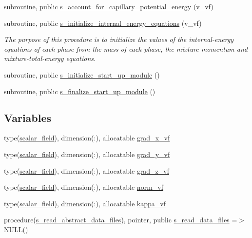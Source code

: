 \begin{DoxyCompactItemize}
subroutine, public \hyperlink{namespacem__start__up_a7e47c12de90e408e70de7da3f2d24e28}{s\+\_\+account\+\_\+for\+\_\+capillary\+\_\+potential\+\_\+energy} (v\+\_\+vf)
\item 
subroutine, public \hyperlink{namespacem__start__up_a38182f7fcc92c1c687840339a20e85cd}{s\+\_\+initialize\+\_\+internal\+\_\+energy\+\_\+equations} (v\+\_\+vf)
\begin{DoxyCompactList}\small\item\em The purpose of this procedure is to initialize the values of the internal-\/energy equations of each phase from the mass of each phase, the mixture momentum and mixture-\/total-\/energy equations. \end{DoxyCompactList}\item 
subroutine, public \hyperlink{namespacem__start__up_a37202711d89d04cd18f08170ba608aa1}{s\+\_\+initialize\+\_\+start\+\_\+up\+\_\+module} ()
\item 
subroutine, public \hyperlink{namespacem__start__up_a65fd279db64882a3732a0549ec74e335}{s\+\_\+finalize\+\_\+start\+\_\+up\+\_\+module} ()
\end{DoxyCompactItemize}
\subsection*{Variables}
\begin{DoxyCompactItemize}
\item 
type(\hyperlink{structm__derived__types_1_1scalar__field}{scalar\+\_\+field}), dimension(\+:), allocatable \hyperlink{namespacem__start__up_acd3b736578c59b1bd9dfc4b81f4a7279}{grad\+\_\+x\+\_\+vf}
\item 
type(\hyperlink{structm__derived__types_1_1scalar__field}{scalar\+\_\+field}), dimension(\+:), allocatable \hyperlink{namespacem__start__up_a2e9ad6009d63488a8f8c7a3a548ba433}{grad\+\_\+y\+\_\+vf}
\item 
type(\hyperlink{structm__derived__types_1_1scalar__field}{scalar\+\_\+field}), dimension(\+:), allocatable \hyperlink{namespacem__start__up_ada153b7f1b2f725b026b89cd187d3206}{grad\+\_\+z\+\_\+vf}
\item 
type(\hyperlink{structm__derived__types_1_1scalar__field}{scalar\+\_\+field}), dimension(\+:), allocatable \hyperlink{namespacem__start__up_ae380781597535aa125ff18847b85a206}{norm\+\_\+vf}
\item 
type(\hyperlink{structm__derived__types_1_1scalar__field}{scalar\+\_\+field}), dimension(\+:), allocatable \hyperlink{namespacem__start__up_a7744b5bc78146b1334d0c019d83c985e}{kappa\+\_\+vf}
\item 
procedure(\hyperlink{interfacem__start__up_1_1s__read__abstract__data__files}{s\+\_\+read\+\_\+abstract\+\_\+data\+\_\+files}), pointer, public \hyperlink{namespacem__start__up_a76bcd559339a2dac17d36b71eb912556}{s\+\_\+read\+\_\+data\+\_\+files} =$>$ N\+U\+LL()
\end{DoxyCompactItemize}


